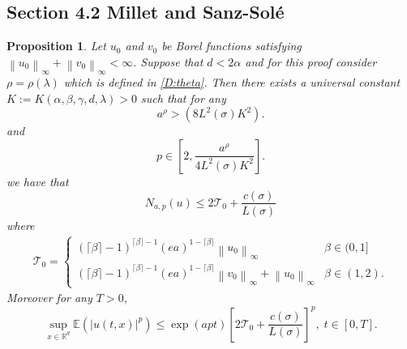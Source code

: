 \documentclass[a4paper,11pt]{article}
\numberwithin{equation}{section}
\theoremstyle{plain}
\newtheorem{proposition}[theorem]{Proposition}
\theoremstyle{definition}
\newcommand{\Norm}[1]{\left\|  #1   \right\|}
\newcommand{\R}{\mathbb{R}}
\numberwithin{NQ}{section}
\numberwithin{LQ}{section}
\numberwithin{ZQ}{section}
\begin{document}
	\subsection{Section 4.2 Millet and Sanz-Sol\'e \cite{SoleMillet2021}}
	
	\begin{proposition}{\normalfont\cite[Proposition 4.4]{SoleMillet2021}}
		Let $u_0$ and $v_0$ be Borel functions satisfying $\Norm{u_0}_\infty + \Norm{v_0}_\infty < \infty$. Suppose that $d < 2 \alpha$ and for this proof consider $\rho = \rho(\lambda)$ which is defined in \eqref{D:theta}. Then there exists a universal constant $K:=K(\alpha, \beta, \gamma,d, \lambda ) >0$ such that for any 
		\[
		a^\rho > \left( 8 L^2(\sigma)K^2\right).
		\]
		and 
		\[
		p \in \left[ 2, \frac{a^{\rho}}{4L^2(\sigma)K^2} \right].
		\]
		we have that 
		\begin{equation}
		\label{E:ColorNbdd}
		N_{a,p}(u)  \le 2 \mathcal{T}_0 +  \frac{c(\sigma)}{L(\sigma)}
		\end{equation}	
		where
		\begin{align*}
		\mathcal{T}_0 = \begin{cases} 
		(\lceil \beta \rceil - 1)^{\lceil \beta \rceil -1}(ea)^{1-\lceil \beta \rceil} \Norm{u_0}_\infty  & \beta \in (0,1]
		\\ (\lceil \beta \rceil - 1)^{\lceil \beta \rceil -1}(ea)^{1-\lceil \beta \rceil} \Norm{v_0}_\infty + \Norm{u_0}_\infty & \beta \in (1,2).
		\end{cases} 
		\end{align*}
		Moreover for any $T>0$,
		\begin{equation}
		\label{E:ColorPMomBdd}
		\sup_{x\in\R^d} \mathbb{E}(|u(t,x)|^p) \le \exp\left( a p t  \right) \left[ 2 \mathcal{T}_0 + \frac{ c(\sigma) }{L(\sigma)} \right]^p, \; t\in[0,T].
		\end{equation}
	\end{proposition}
	
\end{document}
